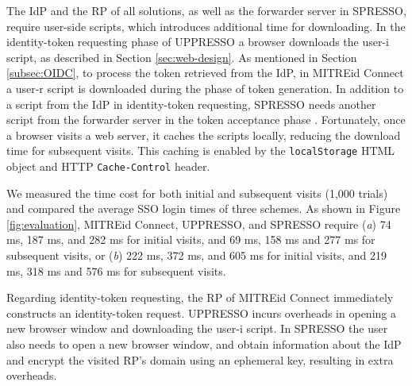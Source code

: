 The IdP and the RP of all solutions, as well as the forwarder server in SPRESSO,
     require user-side scripts, which introduces additional time for downloading. 
In the identity-token requesting phase of UPPRESSO a browser downloads the user-i script,
    as described in Section \ref{sec:web-design}.
As mentioned in Section \ref{subsec:OIDC},
 to process the token retrieved from the IdP, %
    in MITREid Connect a user-r script is downloaded during the phase of token generation.
In addition to a script from the IdP in identity-token requesting,
SPRESSO needs another script from the forwarder server in the token acceptance phase \cite{SPRESSO}.
Fortunately, once a browser visits a web server, it caches the scripts locally, reducing the download time for subsequent visits.
This caching is enabled by the \verb+localStorage+ HTML object \cite{htmlStorageHtml} and HTTP  \texttt{Cache-Control} header.

We measured the time cost for both initial and subsequent visits (1,000 trials) and compared the average SSO login times of three schemes.
As shown in Figure \ref{fig:evaluation},
MITREid Connect, UPPRESSO, and SPRESSO require (\emph{a}) 74 ms, 187 ms, and 282 ms for initial visits, and 69 ms, 158 ms and 277 ms for subsequent visits,
 or (\emph{b}) 222 ms, 372 ms, and 605 ms for initial visits, and 219 ms, 318 ms and 576 ms for subsequent visits.

Regarding identity-token requesting, %
the RP of MITREid Connect immediately constructs an identity-token request. %
UPPRESSO incurs overheads in opening a new browser window and downloading the user-i script.
%
%
In SPRESSO the user also needs to open a new browser window, and obtain information about the IdP %
and encrypt the visited RP's domain using an ephemeral key, resulting in extra overheads.


